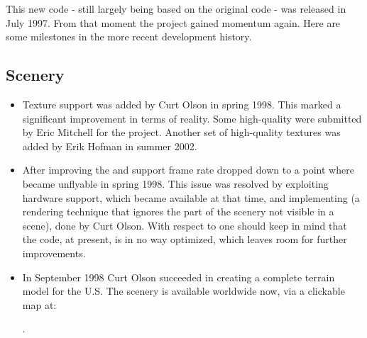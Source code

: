 This new \FlightGear{} code - still largely being based on the original 
code - was released in July 1997. From that moment the project gained momentum again.
Here are some milestones in the more recent development history.

\subsection{Scenery}
\begin{itemize}
\item Texture support was added by Curt
Olson in spring 1998. This marked a significant improvement in terms of reality. Some high-quality  were submitted by Eric Mitchell for the \FlightGear{} project. Another set of high-quality textures was added by Erik Hofman in summer 2002.
 \item After improving the  and  support  frame rate dropped down to a point where \FlightGear{} became unflyable in spring 1998. This issue was resolved by exploiting hardware   support, which became available at that time, and implementing   (a rendering technique that ignores the
 part of the scenery not visible in a scene), done by Curt Olson.
 With respect to  one should keep in mind that the code, at present, is in no way optimized, which leaves room for further improvements.
 \item In September 1998 Curt Olson  succeeded in creating a complete terrain model for the U.S. The  scenery is available worldwide now, via a clickable map  at:
   \medskip

.
 \medskip


\end{itemize}
